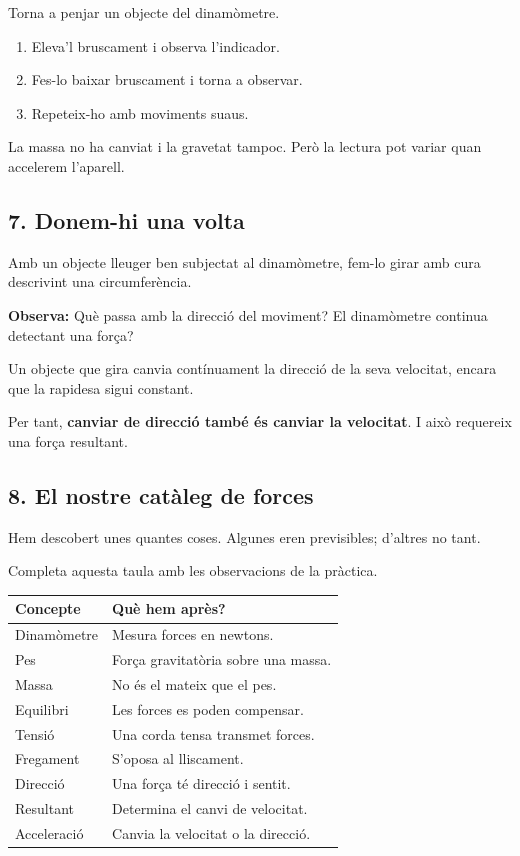 Torna a penjar un objecte del dinamòmetre.

\begin{enumerate}
    \item Eleva'l bruscament i observa l'indicador.
    \item Fes-lo baixar bruscament i torna a observar.
    \item Repeteix-ho amb moviments suaus.
\end{enumerate}

La massa no ha canviat i la gravetat tampoc. Però la lectura pot variar quan accelerem l'aparell.

\subsection{7. Donem-hi una volta}

Amb un objecte lleuger ben subjectat al dinamòmetre, fem-lo girar amb cura descrivint una circumferència.

\textbf{Observa:} Què passa amb la direcció del moviment? El dinamòmetre continua detectant una força?

Un objecte que gira canvia contínuament la direcció de la seva velocitat, encara que la rapidesa sigui constant.

Per tant, \textbf{canviar de direcció també és canviar la velocitat}. I això requereix una força resultant.

\subsection{8. El nostre catàleg de forces}

Hem descobert unes quantes coses. Algunes eren previsibles; d'altres no tant.

Completa aquesta taula amb les observacions de la pràctica.

{\footnotesize
\setlength{\tabcolsep}{3pt}
\renewcommand{\arraystretch}{1.3}
\begin{center}
\begin{tabular}{|p{}|p{}|}
\hline
\textbf{Concepte} & \textbf{Què hem après?} \\ \hline
Dinamòmetre & Mesura forces en newtons. \\ \hline
Pes & Força gravitatòria sobre una massa. \\ \hline
Massa & No és el mateix que el pes. \\ \hline
Equilibri & Les forces es poden compensar. \\ \hline
Tensió & Una corda tensa transmet forces. \\ \hline
Fregament & S'oposa al lliscament. \\ \hline
Direcció & Una força té direcció i sentit. \\ \hline
Resultant & Determina el canvi de velocitat. \\ \hline
Acceleració & Canvia la velocitat o la direcció. \\ \hline
\end{tabular}
\end{center}
}

